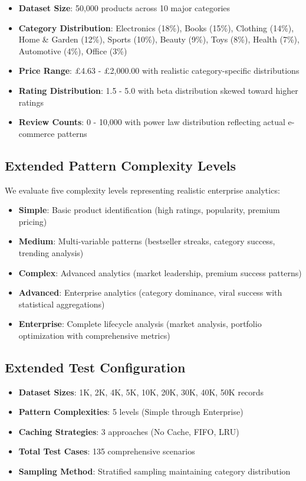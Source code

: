 \documentclass[conference]{IEEEtran}
\begin{document}
\begin{itemize}
\item \textbf{Dataset Size}: 50,000 products across 10 major categories
\item \textbf{Category Distribution}: Electronics (18\%), Books (15\%), Clothing (14\%), Home \& Garden (12\%), Sports (10\%), Beauty (9\%), Toys (8\%), Health (7\%), Automotive (4\%), Office (3\%)
\item \textbf{Price Range}: £4.63 - £2,000.00 with realistic category-specific distributions
\item \textbf{Rating Distribution}: 1.5 - 5.0 with beta distribution skewed toward higher ratings
\item \textbf{Review Counts}: 0 - 10,000 with power law distribution reflecting actual e-commerce patterns
\end{itemize}

\subsection{Extended Pattern Complexity Levels}

We evaluate five complexity levels representing realistic enterprise analytics:

\begin{itemize}
\item \textbf{Simple}: Basic product identification (high ratings, popularity, premium pricing)
\item \textbf{Medium}: Multi-variable patterns (bestseller streaks, category success, trending analysis)
\item \textbf{Complex}: Advanced analytics (market leadership, premium success patterns)
\item \textbf{Advanced}: Enterprise analytics (category dominance, viral success with statistical aggregations)
\item \textbf{Enterprise}: Complete lifecycle analysis (market analysis, portfolio optimization with comprehensive metrics)
\end{itemize}

\subsection{Extended Test Configuration}

\begin{itemize}
\item \textbf{Dataset Sizes}: 1K, 2K, 4K, 5K, 10K, 20K, 30K, 40K, 50K records
\item \textbf{Pattern Complexities}: 5 levels (Simple through Enterprise)
\item \textbf{Caching Strategies}: 3 approaches (No Cache, FIFO, LRU)
\item \textbf{Total Test Cases}: 135 comprehensive scenarios
\item \textbf{Sampling Method}: Stratified sampling maintaining category distribution
\end{itemize}
\end{document}
